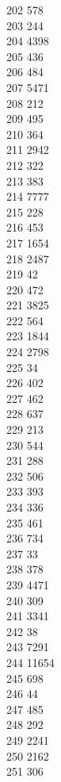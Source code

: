 { 202	578 \\
 203	244 \\
 204	4398 \\
 205	436 \\
 206	484 \\
 207	5471 \\
 208	212 \\
 209	495 \\
 210	364 \\
 211	2942 \\
 212	322 \\
 213	383 \\
 214	7777 \\
 215	228 \\
 216	453 \\
 217	1654 \\
 218	2487 \\
 219	42 \\
 220	472 \\
 221	3825 \\
 222	564 \\
 223	1844 \\
 224	2798 \\
 225	34 \\
 226	402 \\
 227	462 \\
 228	637 \\
 229	213 \\
 230	544 \\
 231	288 \\
 232	506 \\
 233	393 \\
 234	336 \\
 235	461 \\
 236	734 \\
 237	33 \\
 238	378 \\
 239	4471 \\
 240	309 \\
 241	3341 \\
 242	38 \\
 243	7291 \\
 244	11654 \\
 245	698 \\
 246	44 \\
 247	485 \\
 248	292 \\
 249	2241 \\
 250	2162 \\
 251	306 \\
}
